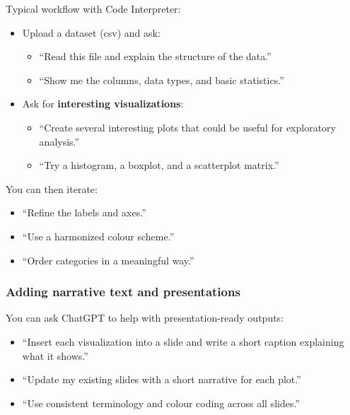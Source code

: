 \documentclass[
  letterpaper,
  DIV=11,
  numbers=noendperiod]{scrreprt}
\providecommand{\tightlist}{%
  \setlength{\itemsep}{0pt}\setlength{\parskip}{0pt}}
\begin{document}
Typical workflow with Code Interpreter:

\begin{itemize}
\tightlist
\item
  Upload a dataset (csv) and ask:

  \begin{itemize}
  \tightlist
  \item
    ``Read this file and explain the structure of the data.''
  \item
    ``Show me the columns, data types, and basic statistics.''
  \end{itemize}
\item
  Ask for \textbf{interesting visualizations}:

  \begin{itemize}
  \tightlist
  \item
    ``Create several interesting plots that could be useful for
    exploratory analysis.''
  \item
    ``Try a histogram, a boxplot, and a scatterplot matrix.''
  \end{itemize}
\end{itemize}

You can then iterate:

\begin{itemize}
\tightlist
\item
  ``Refine the labels and axes.''
\item
  ``Use a harmonized colour scheme.''
\item
  ``Order categories in a meaningful way.''
\end{itemize}

\subsubsection{Adding narrative text and
presentations}\label{adding-narrative-text-and-presentations}

You can ask ChatGPT to help with presentation-ready outputs:

\begin{itemize}
\tightlist
\item
  ``Insert each visualization into a slide and write a short caption
  explaining what it shows.''
\item
  ``Update my existing slides with a short narrative for each plot.''
\item
  ``Use consistent terminology and colour coding across all slides.''
\end{itemize}
\end{document}
